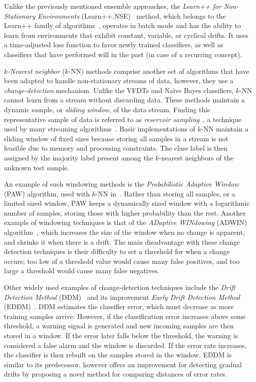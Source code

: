 \documentclass[reqno]{vcuthesis}
\numberwithin{equation}{chapter}
\begin{document}
Unlike the previously mentioned ensemble approaches, the \textit{Learn++ for Non-Stationary Environments} (Learn++.NSE)~\cite{elwell2011incremental} method, which belongs to the Learn++ family of algorithms~\cite{polikar2001learn}, operates in batch mode and has the ability to learn from environments that exhibit constant, variable, or cyclical drifts. It uses a time-adjusted loss function to favor newly trained classifiers, as well as classifiers that have performed will in the past (in case of a recurring concept). 

\textit{$k$-Nearest neighbor} ($k$-NN) methods comprise another set of algorithms that have been adapted to handle non-stationary streams of data, however, they use a \textit{change-detection} mechanism. Unlike the VFDTs and Na\"{i}ve Bayes classifiers, $k$-NN cannot learn from a stream without discarding data. These methods maintain a dynamic sample, or \textit{sliding window}, of the data stream. Finding this representative sample of data is referred to as \textit{reservoir sampling}~\cite{vitter1985random}, a technique used by many streaming algorithms~\cite{ditzler2015learning}. Basic implementations of $k$-NN maintain a sliding window of fixed sizes because storing all samples in a stream is not feasible due to memory and processing constraints. The class label is then assigned by the majority label present among the $k$-nearest neighbors of the unknown test sample. 

An example of such windowing methods is the \textit{Probabilistic Adaptive Window} (PAW) algorithm, used with $k$-NN in~\cite{bifet2013efficient}. Rather than storing all samples, or a limited sized window, PAW keeps a dynamically sized window with a logarithmic number of samples, storing those with higher probability than the rest. Another example of windowing techniques is that of the \textit{ADaptive WINdowing} (ADWIN) algorithm~\cite{bifet2007learning}, which increases the size of the window when no change is apparent, and shrinks it when there is a drift. The main disadvantage with these change detection techniques is their difficulty to set a threshold for when a change occurs; too low of a threshold value would cause many false positives, and too large a threshold would cause many false negatives. 

Other widely used examples of change-detection techniques include the \textit{Drift Detection Method} (DDM)~\cite{gama2004learning} and its improvement \textit{Early Drift Detection Method} (EDDM)~\cite{baena2006early}. DDM estimates the classifier error, which must decrease as more training samples arrive. However, if the classification error increases above some threshold, a warning signal is generated and new incoming samples are then stored in a window. If the error later falls below the threshold, the warning is considered a false alarm and the window is discarded. If the error rate increases, the classifier is then rebuilt on the samples stored in the window. EDDM is similar to its predecessor, however offers an improvement for detecting gradual drifts by proposing a novel method for comparing distances of error rates.
\end{document}

